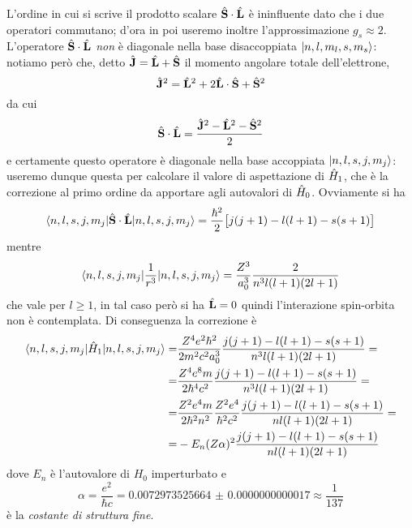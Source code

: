 L'ordine in cui si scrive il prodotto scalare ${\hat{\mathbf{S}}}\cdot{\hat{\mathbf{L}}}$ è ininfluente dato che i due operatori commutano; d'ora in poi useremo inoltre l'approssimazione $g_s\approx 2$.
L'operatore ${\hat{\mathbf{S}}}\cdot{\hat{\mathbf{L}}}$ \emph{non} è diagonale nella base disaccoppiata $\lvert n,l,m_l,s,m_s\rangle$: notiamo però che, detto $\hat{\mathbf{J}}=\hat{\mathbf{L}}+\hat{\mathbf{S}}$ il momento angolare totale dell'elettrone,
\begin{equation}
    \hat{\mathbf{J}}^2=\hat{\mathbf{L}}^2+2{\hat{\mathbf{L}}}\cdot{\hat{\mathbf{S}}}+\hat{\mathbf{S}}^2
\end{equation}
da cui
\begin{equation}
    {\hat{\mathbf{S}}}\cdot{\hat{\mathbf{L}}}=\frac{\hat{\mathbf{J}}^2-\hat{\mathbf{L}}^2-\hat{\mathbf{S}}^2}2
\end{equation}
e certamente questo operatore è diagonale nella base accoppiata $\lvert n,l,s,j,m_j\rangle$: useremo dunque questa per calcolare il valore di aspettazione di $\hat{H}_1$, che è la correzione al primo ordine da apportare agli autovalori di $\hat{H}_0$.
Ovviamente si ha
\begin{equation}
    \langle n,l,s,j,m_j\rvert{\hat{\mathbf{S}}}\cdot{\hat{\mathbf{L}}}\lvert n,l,s,j,m_j\rangle=\frac{\hbar^2}2\bigl[j(j+1)-l(l+1)-s(s+1)\bigr]
\end{equation}
mentre
\begin{equation}
    \langle n,l,s,j,m_j\rvert\frac1{r^3}\lvert n,l,s,j,m_j\rangle=\frac{Z^3}{a_0^3}\frac2{n^3l(l+1)(2l+1)}
\end{equation}
che vale per $l\ge 1$, in tal caso però si ha $\hat{\mathbf{L}}=0$ quindi l'interazione spin-orbita non è contemplata.
Di conseguenza la correzione è
\begin{equation}
    \begin{split}
        \langle n,l,s,j,m_j\rvert\hat{H}_1\lvert n,l,s,j,m_j\rangle=&
        \frac{Z^4e^2\hbar^2}{2m^2c^2a_0^3}\frac{j(j+1)-l(l+1)-s(s+1)}{n^3l(l+1)(2l+1)}=\\=&
        \frac{Z^4e^8m}{2\hbar^4c^2}\frac{j(j+1)-l(l+1)-s(s+1)}{n^3l(l+1)(2l+1)}=\\=&
        \frac{Z^2e^4m}{2\hbar^2n^2}\frac{Z^2e^4}{\hbar^2c^2}\frac{j(j+1)-l(l+1)-s(s+1)}{nl(l+1)(2l+1)}=\\=&
        -E_n(Z\alpha)^2\frac{j(j+1)-l(l+1)-s(s+1)}{nl(l+1)(2l+1)}
    \end{split}
    \label{eq:correzione-spin-orbita}
\end{equation}
dove $E_n$ è l'autovalore di $H_0$ imperturbato e
\begin{equation}
    \alpha=\frac{e^2}{\hbar c}=\num{0.0072973525664(17)}\approx\frac1{137}
    \label{eq:costante-struttura-fine}
\end{equation}
è la \emph{costante di struttura fine}.


